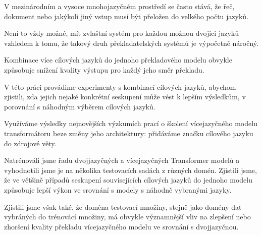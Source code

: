 \documentclass[12pt]{report}
\begin{document}

V mezinárodním a vysoce mnohojazyčném prostředí se často
stává, že řeč, dokument nebo jakýkoli jiný vstup musí být
přeložen do velkého počtu jazyků.

Není to vždy možné, mít zvlaštní systém pro každou možnou
dvojici jazyků vzhledem k tomu, že takový druh překladatelských
systémů je výpočetně náročný.

Kombinace více cílových jazyků do jednoho překladového modelu
obvykle způsobuje snížení kvality výstupu pro každý jeho směr
překladu.

V této práci provádime experimenty s kombinací cílových jazyků,
abychom zjistili, zda jejich nejaké konkrétní seskupení může vést
k lepším výsledkům, v porovnání s náhodným výběrem cílových jazyků.

Využíváme výsledky nejnovějších výzkumích prací o školení
vícejazyčného modelu transformátoru beze změny jeho architektury:
přidáváme značku cílového jazyku do zdrojové věty.

Natrénováli jsme řadu dvojjazyčných a vícejazyčných Transformer
modelů a vyhodnotili jsme je na několika testovacích sadách z
různých domén.
Zjistili jsme, že ve většině případů seskupení souvisejících
cílových jazyků do jednoho modelu způsobuje lepší výkon ve
srovnání s modely s náhodně vybranými jazyky.

Zjistili jsme však také, že doména testovací množiny, stejně jako
domény dat vybráných do trénovácí množiny, má obvykle významnější
vliv na zlepšení nebo zhoršení kvality překladu vícejazyčného modelu
ve srovnání s dvojjazyčnou.
\end{document}
